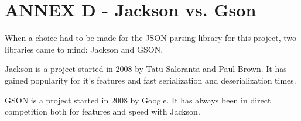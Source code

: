 \section{ANNEX D - Jackson vs. Gson}

When a choice had to be made for the JSON parsing library for this project, two
libraries came to mind: Jackson and GSON.\newline

Jackson is a project started in 2008 by Tatu Saloranta and Paul Brown. It has
gained popularity for it's features and fast serialization and deserialization
times.\newline

GSON is a project started in 2008 by Google. It has always been in direct
competition both for features and speed with Jackson.\newline

